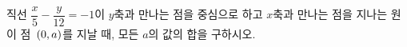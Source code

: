 직선 $\dfrac{x}{5}-\dfrac{y}{12}=-1$이 $y$축과 만나는 점을 중심으로 하고 $x$축과 만나는 점을 지나는 원이 점~$(0{,}\mkern3mu\mathopen{}a)$를 지날 때, 모든 $a$의 값의 합을 구하시오.
